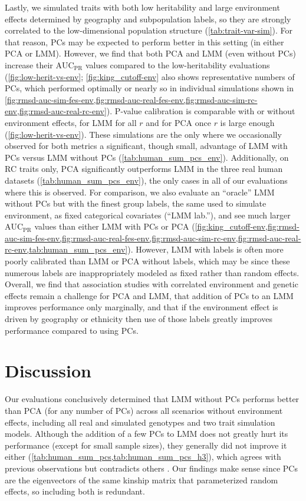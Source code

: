 \documentclass[11pt]{article}
\newcommand{\auc}{\text{AUC}_\text{PR}}
\begin{document}
\begin{linenumbers}
Lastly, we simulated traits with both low heritability and large environment effects determined by geography and subpopulation labels, so they are strongly correlated to the low-dimensional population structure (\cref{tab:trait-var-sim}).
For that reason, PCs may be expected to perform better in this setting (in either PCA or LMM).
However, we find that both PCA and LMM (even without PCs) increase their $\auc$ values compared to the low-heritability evaluations (\cref{fig:low-herit-vs-env}; \cref{fig:king_cutoff-env} also shows representative numbers of PCs, which performed optimally or nearly so in individual simulations shown in \cref{fig:rmsd-auc-sim-fes-env,fig:rmsd-auc-real-fes-env,fig:rmsd-auc-sim-rc-env,fig:rmsd-auc-real-rc-env}).
P-value calibration is comparable with or without environment effects, for LMM for all $r$ and for PCA once $r$ is large enough (\cref{fig:low-herit-vs-env}).
These simulations are the only where we occasionally observed for both metrics a significant, though small, advantage of LMM with PCs versus LMM without PCs (\cref{tab:human_sum_pcs_env}).
Additionally, on RC traits only, PCA significantly outperforms LMM in the three real human datasets (\cref{tab:human_sum_pcs_env}), the only cases in all of our evaluations where this is observed.
For comparison, we also evaluate an ``oracle'' LMM without PCs but with the finest group labels, the same used to simulate environment, as fixed categorical covariates (``LMM lab.''), and see much larger $\auc$ values than either LMM with PCs or PCA (\cref{fig:king_cutoff-env,fig:rmsd-auc-sim-fes-env,fig:rmsd-auc-real-fes-env,fig:rmsd-auc-sim-rc-env,fig:rmsd-auc-real-rc-env,tab:human_sum_pcs_env}).
However, LMM with labels is often more poorly calibrated than LMM or PCA without labels, which may be since these numerous labels are inappropriately modeled as fixed rather than random effects.
Overall, we find that association studies with correlated environment and genetic effects remain a challenge for PCA and LMM, that addition of PCs to an LMM improves performance only marginally, and that if the environment effect is driven by geography or ethnicity then use of those labels greatly improves performance compared to using PCs.

\section{Discussion}

Our evaluations conclusively determined that LMM without PCs performs better than PCA (for any number of PCs) across all scenarios without environment effects, including all real and simulated genotypes and two trait simulation models.
Although the addition of a few PCs to LMM does not greatly hurt its performance (except for small sample sizes), they generally did not improve it either (\cref{tab:human_sum_pcs,tab:human_sum_pcs_h3}), which agrees with previous observations \citep{liu_controlling_2011, janss_inferences_2012} but contradicts others \citep{zhao_arabidopsis_2007, price_new_2010}.
Our findings make sense since PCs are the eigenvectors of the same kinship matrix that parameterized random effects, so including both is redundant.


\end{linenumbers}
\end{document}

